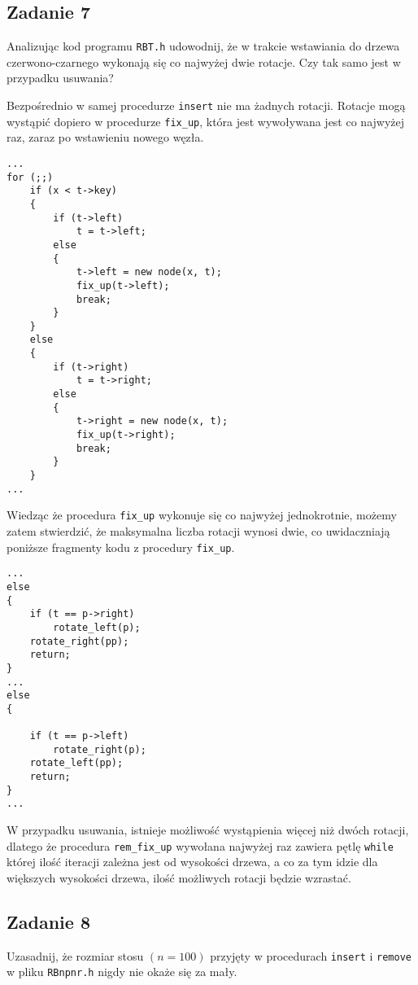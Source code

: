 \documentclass{article}
\begin{document}
\subsection*{Zadanie 7}
Analizując kod programu \verb+RBT.h+ udowodnij, że w trakcie wstawiania do drzewa czerwono-czarnego
wykonają się co najwyżej dwie rotacje. Czy tak samo jest w przypadku usuwania?
\begin{multicols}{2}
    \noindent
    Bezpośrednio w samej procedurze \verb+insert+ nie ma żadnych rotacji. Rotacje mogą wystąpić dopiero w procedurze
    \verb+fix_up+, która jest wywoływana jest co najwyżej raz, zaraz po wstawieniu nowego węzła.
    \begin{lstlisting}
...
for (;;)
    if (x < t->key)
    {
        if (t->left)
            t = t->left;
        else
        {
            t->left = new node(x, t);
            fix_up(t->left);
            break;
        }
    }
    else
    {
        if (t->right)
            t = t->right;
        else
        {
            t->right = new node(x, t);
            fix_up(t->right);
            break;
        }
    }
...
    \end{lstlisting}
    \columnbreak
    Wiedząc że procedura \verb+fix_up+ wykonuje się co najwyżej jednokrotnie, możemy zatem stwierdzić, że maksymalna
    liczba rotacji wynosi dwie, co uwidaczniają poniższe fragmenty kodu z procedury \verb+fix_up+.
    \begin{lstlisting}
...
else
{
    if (t == p->right)
        rotate_left(p);
    rotate_right(pp);
    return;
}
...
else
{

    if (t == p->left)
        rotate_right(p);
    rotate_left(pp);
    return;
}
...
    \end{lstlisting}
\end{multicols}
\noindent
W przypadku usuwania, istnieje możliwość wystąpienia więcej niż dwóch rotacji, dlatego że procedura \verb+rem_fix_up+
wywołana najwyżej raz zawiera pętlę \verb+while+ której ilość iteracji zależna jest od wysokości drzewa, a co za tym
idzie dla większych wysokości drzewa, ilość możliwych rotacji będzie wzrastać.

\pagebreak
\subsection*{Zadanie 8}
Uzasadnij, że rozmiar stosu $(n = 100)$ przyjęty w procedurach \verb+insert+ i \verb+remove+ w pliku
\verb+RBnpnr.h+ nigdy nie okaże się za mały. \\
\end{document}
